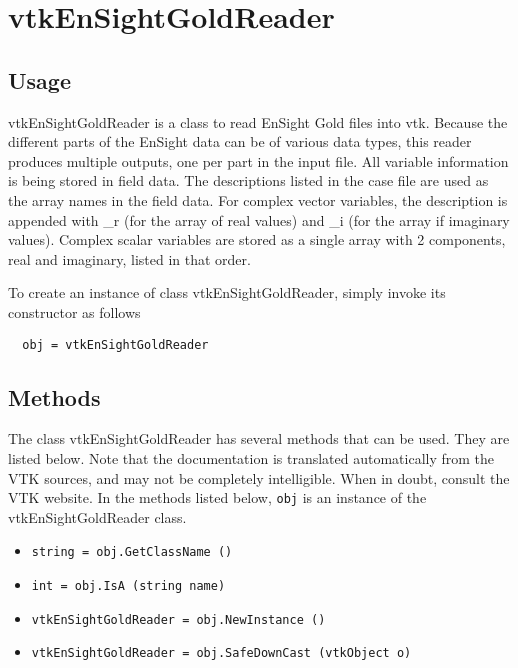 \section{vtkEnSightGoldReader}

\subsection{Usage}

 vtkEnSightGoldReader is a class to read EnSight Gold files into vtk.
 Because the different parts of the EnSight data can be of various data
 types, this reader produces multiple outputs, one per part in the input
 file.
 All variable information is being stored in field data.  The descriptions
 listed in the case file are used as the array names in the field data.
 For complex vector variables, the description is appended with \_r (for the
 array of real values) and \_i (for the array if imaginary values).  Complex
 scalar variables are stored as a single array with 2 components, real and
 imaginary, listed in that order.

To create an instance of class vtkEnSightGoldReader, simply
invoke its constructor as follows
\begin{verbatim}
  obj = vtkEnSightGoldReader
\end{verbatim}
\subsection{Methods}

The class vtkEnSightGoldReader has several methods that can be used.
  They are listed below.
Note that the documentation is translated automatically from the VTK sources,
and may not be completely intelligible.  When in doubt, consult the VTK website.
In the methods listed below, \verb|obj| is an instance of the vtkEnSightGoldReader class.
\begin{itemize}
\item  \verb|string = obj.GetClassName ()|

\item  \verb|int = obj.IsA (string name)|

\item  \verb|vtkEnSightGoldReader = obj.NewInstance ()|

\item  \verb|vtkEnSightGoldReader = obj.SafeDownCast (vtkObject o)|

\end{itemize}
